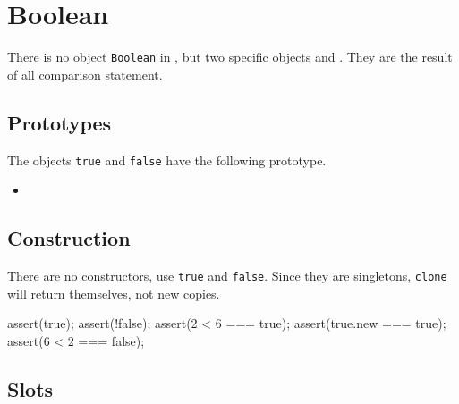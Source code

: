 \section{Boolean}

There is no object \lstinline|Boolean| in \us, but two specific
objects  and .  They are the result of
all comparison statement.


\subsection{Prototypes}

The objects \lstinline|true| and \lstinline|false| have the following
prototype.

\begin{itemize}
\item {}
\end{itemize}

\subsection{Construction}

There are no constructors, use \lstinline|true| and \lstinline|false|.
Since they are singletons, \lstinline|clone| will return themselves,
not new copies.

\begin{urbiscript}
assert(true);
assert(!false);
assert(2 < 6 === true);
assert(true.new === true);
assert(6 < 2 === false);
\end{urbiscript}

\subsection{Slots}

